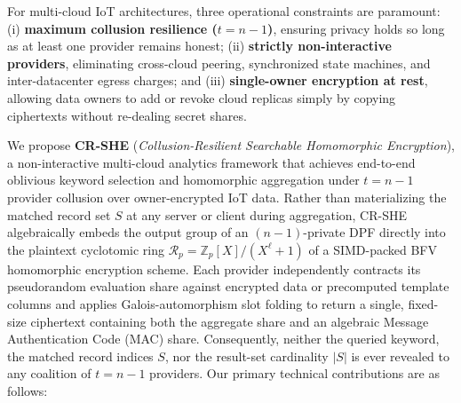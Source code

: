 \documentclass[11pt,a4paper]{article}
\begin{document}
For multi-cloud IoT architectures, three operational constraints are paramount: (i) \textbf{maximum collusion resilience ($t = n - 1$)}, ensuring privacy holds so long as at least one provider remains honest; (ii) \textbf{strictly non-interactive providers}, eliminating cross-cloud peering, synchronized state machines, and inter-datacenter egress charges; and (iii) \textbf{single-owner encryption at rest}, allowing data owners to add or revoke cloud replicas simply by copying ciphertexts without re-dealing secret shares.

We propose \textbf{CR-SHE} (\textit{Collusion-Resilient Searchable Homomorphic Encryption}), a non-interactive multi-cloud analytics framework that achieves end-to-end oblivious keyword selection and homomorphic aggregation under $t = n - 1$ provider collusion over owner-encrypted IoT data. Rather than materializing the matched record set $S$ at any server or client during aggregation, CR-SHE algebraically embeds the output group of an $(n-1)$-private DPF directly into the plaintext cyclotomic ring $\mathcal{R}_p = \mathbb{Z}_p[X]/(X^\ell + 1)$ of a SIMD-packed BFV homomorphic encryption scheme. Each provider independently contracts its pseudorandom evaluation share against encrypted data or precomputed template columns and applies Galois-automorphism slot folding to return a single, fixed-size ciphertext containing both the aggregate share and an algebraic Message Authentication Code (MAC) share. Consequently, neither the queried keyword, the matched record indices $S$, nor the result-set cardinality $|S|$ is ever revealed to any coalition of $t = n - 1$ providers. Our primary technical contributions are as follows:
\end{document}

